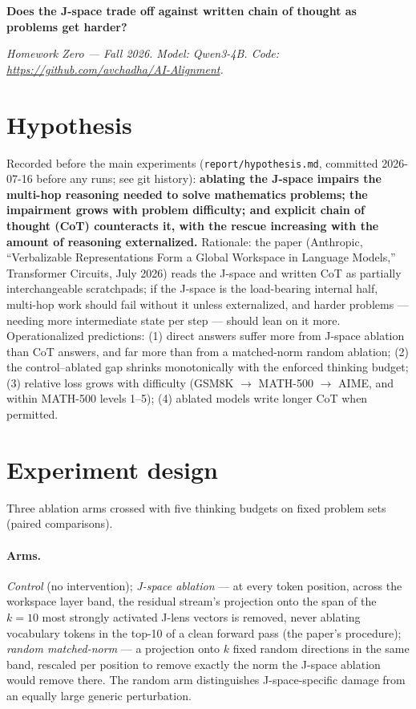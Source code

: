 \documentclass[9pt,twocolumn]{extarticle}
\begin{document}
\begin{center}
  {\LARGE\bfseries Does the J-space trade off against written chain of
   thought as problems get harder?\par}
  \vspace{5pt}
  {\itshape Homework Zero --- Fall 2026. Model: Qwen3-4B. Code:
   \url{https://github.com/avchadha/AI-Alignment}.\par}
\end{center}
\vspace{2pt}

\section{Hypothesis}

Recorded before the main experiments (\texttt{report/hypothesis.md},
committed 2026-07-16 before any runs; see git history): \textbf{ablating the
J-space impairs the multi-hop reasoning needed to solve mathematics
problems; the impairment grows with problem difficulty; and explicit chain
of thought (CoT) counteracts it, with the rescue increasing with the amount
of reasoning externalized.} Rationale: the paper (Anthropic,
``Verbalizable Representations Form a Global Workspace in Language
Models,'' Transformer Circuits, July 2026) reads the J-space and
written CoT as partially interchangeable scratchpads; if the J-space is the
load-bearing internal half, multi-hop work should fail without it unless
externalized, and harder problems --- needing more intermediate state per
step --- should lean on it more. Operationalized predictions: (1) direct
answers suffer more from J-space ablation than CoT answers, and far more
than from a matched-norm random ablation; (2) the control--ablated gap
shrinks monotonically with the enforced thinking budget; (3) relative loss
grows with difficulty (GSM8K $\to$ MATH-500 $\to$ AIME, and within MATH-500
levels 1--5); (4) ablated models write longer CoT when permitted.

\section{Experiment design}

Three ablation arms crossed with five thinking budgets on fixed problem
sets (paired comparisons).

\paragraph{Arms.} \emph{Control} (no intervention); \emph{J-space ablation}
--- at every token position, across the workspace layer band, the residual
stream's projection onto the span of the $k = 10$ most strongly activated
J-lens vectors is removed, never ablating vocabulary tokens in the top-10
of a clean forward pass (the paper's procedure); \emph{random matched-norm} --- a
projection onto $k$ fixed random directions in the same band, rescaled per
position to remove exactly the norm the J-space ablation would remove
there. The random arm distinguishes J-space-specific damage from an equally
large generic perturbation.
\end{document}

